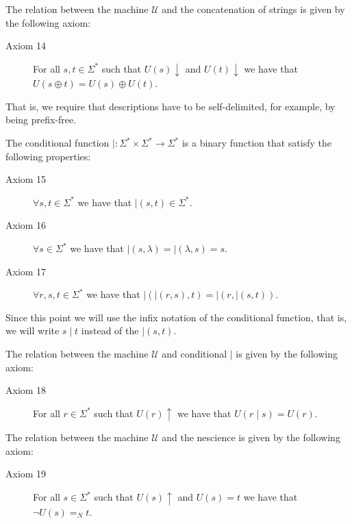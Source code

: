 \vskip 0.25cm

The relation between the machine $\mathcal{U}$ and the concatenation of strings is given by the following axiom:

\vskip 0.25cm

\begin{description}
\item[Axiom 14] For all $s, t \in \Sigma^\ast$ such that $U(s) \downarrow$ and $U(t) \downarrow$ we have that $U(s \oplus t) = U(s) \oplus U(t)$.
\end{description}

\vskip 0.25cm

That is, we require that descriptions have to be self-delimited, for example, by being prefix-free.

The conditional function $\mid : \Sigma^\ast \times \Sigma^\ast \rightarrow \Sigma^\ast$ is a binary function that satisfy the following properties:

\vskip 0.25cm

\begin{description}
\item[Axiom 15] $\forall s, t \in \Sigma^\ast$ we have that $\mid(s, t) \in \Sigma^\ast$.
\item[Axiom 16] $\forall s \in \Sigma^\ast$ we have that $\mid (s, \lambda) = \mid( \lambda, s) = s$.
\item[Axiom 17] $\forall r, s, t \in \Sigma^\ast$ we have that $\mid (\mid (r, s), t) = \mid (r, \mid (s, t))$.
\end{description}

Since this point we will use the infix notation of the conditional function, that is, we will write $s \mid t$ instead of the $\mid (s, t)$.

The relation between the machine $\mathcal{U}$ and conditional $\mid$ is given by the following axiom:

\vskip 0.25cm

\begin{description}
\item[Axiom 18] For all $r \in \Sigma^\ast$ such that $U(r) \uparrow$ we have that $U(r \mid s) = U(r)$.
\end{description}

\vskip 0.25cm

The relation between the machine $\mathcal{U}$ and the nescience is given by the following axiom:

\begin{description}
\item[Axiom 19] For all $s \in \Sigma^\ast$ such that $U(s) \uparrow$ and $U(s) = t$ we have that $\lnot U(s) =_N t$.
\end{description}

